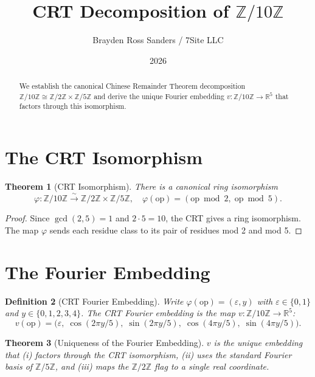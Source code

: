 \documentclass{amsart}
\title{CRT Decomposition of $\mathbb{Z}/10\mathbb{Z}$}
\author{Brayden Ross Sanders / 7Site LLC}
\date{2026}
\newtheorem{theorem}{Theorem}
\newtheorem{definition}[theorem]{Definition}
\begin{document}
\maketitle

\begin{abstract}
We establish the canonical Chinese Remainder Theorem decomposition
$\mathbb{Z}/10\mathbb{Z} \cong \mathbb{Z}/2\mathbb{Z} \times \mathbb{Z}/5\mathbb{Z}$
and derive the unique Fourier embedding $v: \mathbb{Z}/10\mathbb{Z} \to \mathbb{R}^5$
that factors through this isomorphism.
\end{abstract}

\section{The CRT Isomorphism}

\begin{theorem}[CRT Isomorphism]
There is a canonical ring isomorphism
\[
  \varphi: \mathbb{Z}/10\mathbb{Z} \xrightarrow{\;\sim\;} \mathbb{Z}/2\mathbb{Z} \times \mathbb{Z}/5\mathbb{Z},
  \quad \varphi(\mathrm{op}) = (\mathrm{op} \bmod 2,\; \mathrm{op} \bmod 5).
\]
\end{theorem}

\begin{proof}
Since $\gcd(2,5)=1$ and $2 \cdot 5 = 10$, the CRT gives a ring isomorphism. The map
$\varphi$ sends each residue class to its pair of residues mod 2 and mod 5.
\end{proof}

\section{The Fourier Embedding}

\begin{definition}[CRT Fourier Embedding]
Write $\varphi(\mathrm{op}) = (\varepsilon, y)$ with $\varepsilon \in \{0,1\}$ and $y \in \{0,1,2,3,4\}$.
The \emph{CRT Fourier embedding} is the map $v: \mathbb{Z}/10\mathbb{Z} \to \mathbb{R}^5$:
\[
  v(\mathrm{op}) = \bigl(\varepsilon,\; \cos(2\pi y/5),\; \sin(2\pi y/5),\;
                        \cos(4\pi y/5),\; \sin(4\pi y/5)\bigr).
\]
\end{definition}

\begin{theorem}[Uniqueness of the Fourier Embedding]
$v$ is the unique embedding that (i) factors through the CRT isomorphism,
(ii) uses the standard Fourier basis of $\mathbb{Z}/5\mathbb{Z}$, and
(iii) maps the $\mathbb{Z}/2\mathbb{Z}$ flag to a single real coordinate.
\end{theorem}
\end{document}
